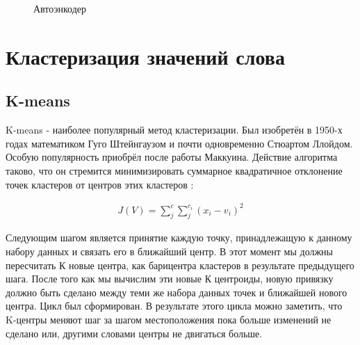 \documentclass[12pt]{article}
\begin{document}
  \begin{figure}[H]
    \noindent{}
    \caption{Автоэнкодер}
    \label{figCurves}
  \end{figure}

\section{Кластеризация значений слова}

\subsection{K-means}

K-means - наиболее популярный метод кластеризации. Был изобретён в 1950-х годах математиком Гуго Штейнгаузом и почти одновременно Стюартом Ллойдом. Особую популярность приобрёл после работы Маккуина. Действие алгоритма таково, что он стремится минимизировать суммарное квадратичное отклонение точек кластеров от центров этих кластеров \cite{kmeans}:

	\begin{align}
		J(V) = \sum_{j}^{c}\sum_{j}^{c_i}(x_i-v_i)^2
	\end{align}

Следующим шагом является принятие каждую точку, принадлежащую к данному набору данных и связать его в ближайший центр. В этот момент мы должны пересчитать К новые центра, как барицентра кластеров в результате предыдущего шага. После того как мы вычислим эти новые К центроиды, новую привязку должно быть сделано между теми же набора данных точек и ближайшей нового центра. Цикл был сформирован. В результате этого цикла можно заметить, что K-центры меняют шаг за шагом местоположения пока больше изменений не сделано или, другими словами центры не двигаться больше.
\end{document}
